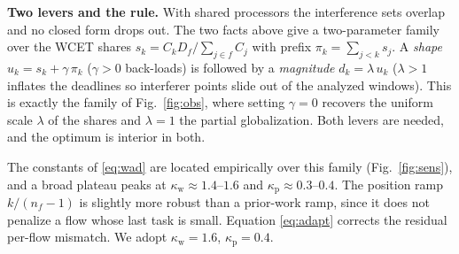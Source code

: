 \documentclass[conference]{IEEEtran}
\begin{document}
\smallskip\noindent\textbf{Two levers and the rule.} With shared processors the
interference sets overlap and no closed form drops out. The two facts above give
a two-parameter family over the WCET shares $s_k=C_kD_f/\sum_{j\in f}C_j$ with
prefix $\pi_k=\sum_{j<k}s_j$. A \emph{shape} $u_k=s_k+\gamma\,\pi_k$ ($\gamma>0$
back-loads) is followed by a \emph{magnitude} $d_k=\lambda\,u_k$ ($\lambda>1$
inflates the deadlines so interferer points slide out of the analyzed windows).
This is exactly the family of Fig.~\ref{fig:obs}, where setting $\gamma=0$
recovers the uniform scale $\lambda$ of the shares and $\lambda=1$ the partial
globalization. Both levers are needed, and the optimum is interior in both.

The constants of \eqref{eq:wad} are located empirically over this family
(Fig.~\ref{fig:sens}), and a broad plateau peaks at
$\kappa_{\mathrm{w}}\approx1.4$--$1.6$ and $\kappa_{\mathrm{p}}\approx0.3$--$0.4$.
The position ramp $k/(n_f-1)$ is slightly more robust than a prior-work ramp,
since it does not penalize a flow whose last task is small. Equation
\eqref{eq:adapt} corrects the residual per-flow mismatch. We adopt
$\kappa_{\mathrm{w}}=1.6$, $\kappa_{\mathrm{p}}=0.4$.
\end{document}
